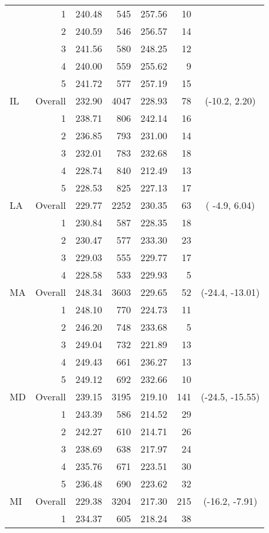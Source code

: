 \begin{longtable}{lrrr@{\extracolsep{.25cm}}rrc}
   & 1 & 240.48 & 545 & 257.56 &  10 &  \\ 
   & 2 & 240.59 & 546 & 256.57 &  14 &  \\ 
   & 3 & 241.56 & 580 & 248.25 &  12 &  \\ 
   & 4 & 240.00 & 559 & 255.62 &   9 &  \\ 
   & 5 & 241.72 & 577 & 257.19 &  15 &  \\ 
   \hline
IL & Overall & 232.90 & 4047 & 228.93 &  78 & (-10.2,   2.20) \\ 
   & 1 & 238.71 & 806 & 242.14 &  16 &  \\ 
   & 2 & 236.85 & 793 & 231.00 &  14 &  \\ 
   & 3 & 232.01 & 783 & 232.68 &  18 &  \\ 
   & 4 & 228.74 & 840 & 212.49 &  13 &  \\ 
   & 5 & 228.53 & 825 & 227.13 &  17 &  \\ 
   \hline
LA & Overall & 229.77 & 2252 & 230.35 &  63 & ( -4.9,   6.04) \\ 
   & 1 & 230.84 & 587 & 228.35 &  18 &  \\ 
   & 2 & 230.47 & 577 & 233.30 &  23 &  \\ 
   & 3 & 229.03 & 555 & 229.77 &  17 &  \\ 
   & 4 & 228.58 & 533 & 229.93 &   5 &  \\ 
   \hline
MA & Overall & 248.34 & 3603 & 229.65 &  52 & (-24.4, -13.01) \\ 
   & 1 & 248.10 & 770 & 224.73 &  11 &  \\ 
   & 2 & 246.20 & 748 & 233.68 &   5 &  \\ 
   & 3 & 249.04 & 732 & 221.89 &  13 &  \\ 
   & 4 & 249.43 & 661 & 236.27 &  13 &  \\ 
   & 5 & 249.12 & 692 & 232.66 &  10 &  \\ 
   \hline
MD & Overall & 239.15 & 3195 & 219.10 & 141 & (-24.5, -15.55) \\ 
   & 1 & 243.39 & 586 & 214.52 &  29 &  \\ 
   & 2 & 242.27 & 610 & 214.71 &  26 &  \\ 
   & 3 & 238.69 & 638 & 217.97 &  24 &  \\ 
   & 4 & 235.76 & 671 & 223.51 &  30 &  \\ 
   & 5 & 236.48 & 690 & 223.62 &  32 &  \\ 
   \hline
MI & Overall & 229.38 & 3204 & 217.30 & 215 & (-16.2,  -7.91) \\ 
   & 1 & 234.37 & 605 & 218.24 &  38 &  \\ 

\end{longtable}
